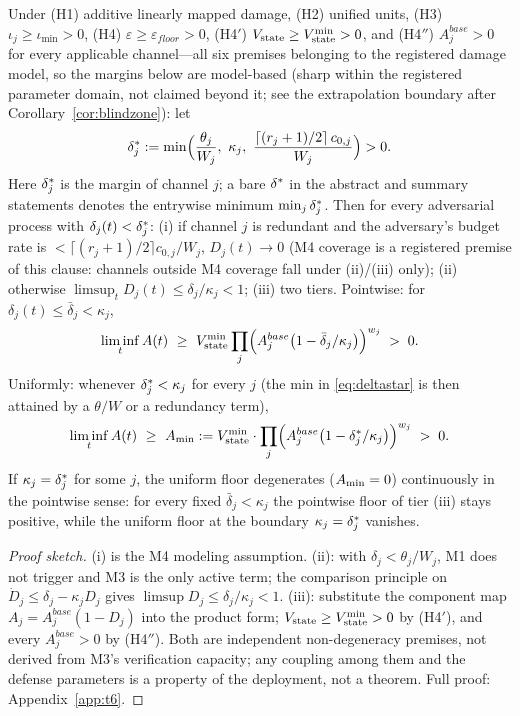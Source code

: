 \begin{theorem}\label{thm:t6}
Under \textup{(H1)} additive linearly mapped damage, \textup{(H2)} unified
units, \textup{(H3)} $\iota_j\ge\iota_{\min}>0$, \textup{(H4)}
$\varepsilon\ge\varepsilon_{floor}>0$, \textup{(H4$'$)}
$V_{\mathrm{state}}\ge V_{\mathrm{state}}^{\min}>0$, and \textup{(H4$''$)} $A_j^{base}>0$ for every
applicable channel---all six premises belonging to the registered
damage model, so the margins below are model-based (sharp within the
registered parameter domain, not claimed beyond it; see the extrapolation
boundary after Corollary~\ref{cor:blindzone}): let
\begin{equation}\label{eq:deltastar}
\delta^{*}_j := \min\Bigl(\frac{\theta_j}{W_j},\ \kappa_j,\
\frac{\lceil(r_j+1)/2\rceil\,c_{0,j}}{W_j}\Bigr)>0.
\end{equation}
Here $\delta^{*}_j$ is the margin of channel $j$; a bare $\delta^{*}$ in the
abstract and summary statements denotes the entrywise minimum
$\min_j\delta^{*}_j$.
Then for every adversarial process with $\delta_j(t)<\delta^{*}_j$:
\textup{(i)} if channel $j$ is redundant and the adversary's budget rate is
$<\lceil(r_j+1)/2\rceil c_{0,j}/W_j$, $D_j(t)\to0$ (M4 coverage is a
registered premise of this clause: channels outside M4 coverage fall under
\textup{(ii)}/\textup{(iii)} only); \textup{(ii)} otherwise
$\limsup_t D_j(t)\le\delta_j/\kappa_j<1$; \textup{(iii)} two tiers. Pointwise:
for $\delta_j(t)\le\bar\delta_j<\kappa_j$,
\[
\liminf_t A(t)\ \ge\ V_{\mathrm{state}}^{\min}\prod_j
\Bigl(A_j^{base}\bigl(1-\bar\delta_j/\kappa_j\bigr)\Bigr)^{w_j}\;>\;
0.
\]
Uniformly: whenever $\delta^{*}_j<\kappa_j$ for every $j$ (the min in
\eqref{eq:deltastar} is then attained by a $\theta/W$ or a redundancy term),
\begin{equation}\label{eq:amin}
\liminf_t A(t)\ \ge\ A_{\min} := V_{\mathrm{state}}^{\min}\cdot
\prod_j \Bigl(A_j^{base}\bigl(1-\delta^{*}_j/\kappa_j\bigr)\Bigr)^{w_j}\;>\;0.
\end{equation}
If $\kappa_j=\delta^{*}_j$ for some $j$, the uniform floor degenerates
($A_{\min}=0$) continuously in the pointwise sense: for every fixed
$\bar\delta_j<\kappa_j$ the pointwise floor of tier (iii) stays positive,
while the uniform floor at the boundary $\kappa_j=\delta^{*}_j$ vanishes.
\end{theorem}
\begin{proof}[Proof sketch]
(i) is the M4 modeling assumption. (ii): with $\delta_j<\theta_j/W_j$, M1 does
not trigger and M3 is the only active term; the comparison principle on
$\dot D_j\le\delta_j-\kappa_jD_j$ gives $\limsup D_j\le\delta_j/\kappa_j<1$.
(iii): substitute the component map $A_j=A_j^{base}(1-D_j)$ into the product
form; $V_{\mathrm{state}}\ge V_{\mathrm{state}}^{\min}>0$ by (H4$'$), and every $A_j^{base}>0$ by
(H4$''$). Both are independent non-degeneracy premises, not derived from M3's
verification capacity; any coupling among them and the defense parameters is
a property of the deployment, not a theorem. Full proof:
Appendix~\ref{app:t6}.
\end{proof}

